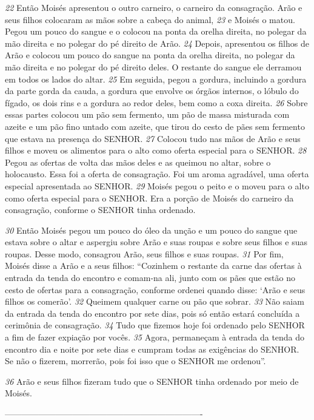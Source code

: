 \bigskip
\textit{\tiny 22}
Então Moisés apresentou o outro carneiro, o carneiro da consagração. Arão e
seus filhos colocaram as mãos sobre a cabeça do animal, 
\textit{\tiny 23}
e Moisés o matou.
Pegou um pouco do sangue e o colocou na ponta da orelha direita, no polegar da
mão direita e no polegar do pé direito de Arão. 
\textit{\tiny 24}
Depois, apresentou os filhos de
Arão e colocou um pouco do sangue na ponta da orelha direita, no polegar da mão
direita e no polegar do pé direito deles. O restante do sangue ele derramou em
todos os lados do altar.
\textit{\tiny 25}
Em seguida, pegou a gordura, incluindo a gordura da parte gorda da cauda, a
gordura que envolve os órgãos internos, o lóbulo do fígado, os dois rins e a
gordura ao redor deles, bem como a coxa direita. 
\textit{\tiny 26}
Sobre essas partes colocou um
pão sem fermento, um pão de massa misturada com azeite e um pão fino untado
com azeite, que tirou do cesto de pães sem fermento que estava na presença do
SENHOR. 
\textit{\tiny 27}
Colocou tudo nas mãos de Arão e seus filhos e moveu os alimentos para
o alto como oferta especial para o SENHOR. 
\textit{\tiny 28}
Pegou as ofertas de volta das mãos
deles e as queimou no altar, sobre o holocausto. Essa foi a oferta de consagração.
Foi um aroma agradável, uma oferta especial apresentada ao SENHOR. 
\textit{\tiny 29}
Moisés
pegou o peito e o moveu para o alto como oferta especial para o SENHOR. Era a
porção de Moisés do carneiro da consagração, conforme o SENHOR tinha
ordenado.
   
\bigskip
\textit{\tiny 30}
Então Moisés pegou um pouco do óleo da unção e um pouco do sangue que
estava sobre o altar e aspergiu sobre Arão e suas roupas e sobre seus filhos e suas
roupas. Desse modo, consagrou Arão, seus filhos e suas roupas.
\textit{\tiny 31}
Por fim, Moisés disse a Arão e a seus filhos: “Cozinhem o restante da carne
das ofertas à entrada da tenda do encontro e comam-na ali, junto com os pães que
estão no cesto de ofertas para a consagração, conforme ordenei quando disse:
‘Arão e seus filhos os comerão’. 
\textit{\tiny 32}
Queimem qualquer carne ou pão que sobrar.
\textit{\tiny 33}
Não saiam da entrada da tenda do encontro por sete dias, pois só então estará
concluída a cerimônia de consagração. 
\textit{\tiny 34}
Tudo que fizemos hoje foi ordenado
pelo SENHOR a fim de fazer expiação por vocês. 
\textit{\tiny 35}
Agora, permaneçam à entrada
da tenda do encontro dia e noite por sete dias e cumpram todas as exigências do
SENHOR. Se não o fizerem, morrerão, pois foi isso que o SENHOR me ordenou”.

\bigskip
\textit{\tiny 36}
Arão e seus filhos fizeram tudo que o SENHOR tinha ordenado por meio de
Moisés.



----------------------------------------------------------------------
